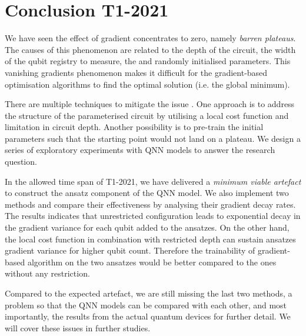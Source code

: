 \section{Conclusion T1-2021}
We have seen the effect of gradient concentrates to zero, namely \emph{barren plateaus}.
The causes of this phenomenon are related to the depth of the circuit, the width of the qubit registry to measure, the and randomly initialised parameters.
This vanishing gradients phenomenon makes it difficult for the gradient-based optimisation algorithms to find the optimal solution (i.e. the global minimum).

There are multiple techniques to mitigate the issue \cite{cerezoCostFunctionDependent2021,skolikLayerwiseLearningQuantum2021,grantInitializationStrategyAddressing2019}.
One approach is to address the structure of the parameterised circuit by utilising a local cost function and limitation in circuit depth.
Another possibility is to pre-train the initial parameters such that the starting point would not land on a plateau.
We design a series of exploratory experiments with QNN models to answer the research question.

In the allowed time span of T1-2021, we have delivered a \emph{minimum viable artefact} to construct the ansatz component of the QNN model.
We also implement two methods and compare their effectiveness by analysing their gradient decay rates.
The results indicates that unrestricted configuration leads to exponential decay in the gradient variance for each qubit added to the ansatzes.
On the other hand, the local cost function in combination with restricted depth can sustain ansatzes gradient variance for higher qubit count.
Therefore the trainability of gradient-based algorithm on the two ansatzes would be better compared to the ones without any restriction.


Compared to the expected artefact, we are still missing the last two methods, a problem so that the QNN models can be compared with each other, and most importantly, the results from the actual quantum devices  for further detail.
We will cover these issues in further studies.